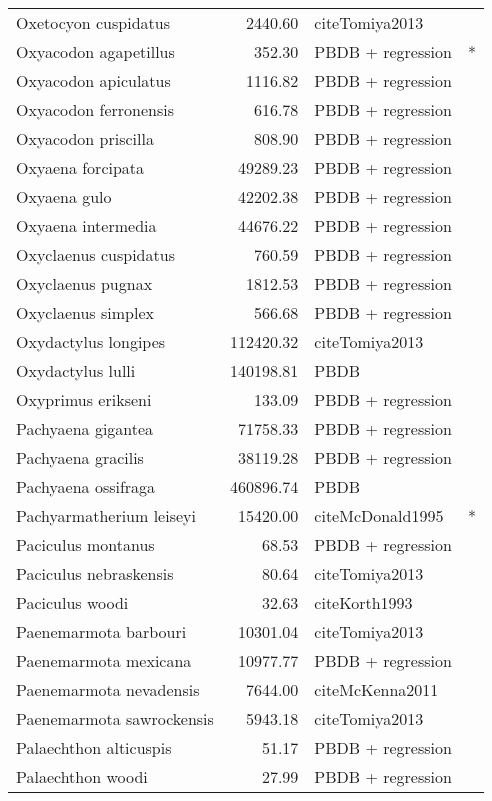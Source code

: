 \begin{table}[ht]
\begin{tabular}{lrll}
  Oxetocyon cuspidatus & 2440.60 & cite{Tomiya2013} &  \\ 
  Oxyacodon agapetillus & 352.30 & PBDB + regression & * \\ 
  Oxyacodon apiculatus & 1116.82 & PBDB + regression &  \\ 
  Oxyacodon ferronensis & 616.78 & PBDB + regression &  \\ 
  Oxyacodon priscilla & 808.90 & PBDB + regression &  \\ 
  Oxyaena forcipata & 49289.23 & PBDB + regression &  \\ 
  Oxyaena gulo & 42202.38 & PBDB + regression &  \\ 
  Oxyaena intermedia & 44676.22 & PBDB + regression &  \\ 
  Oxyclaenus cuspidatus & 760.59 & PBDB + regression &  \\ 
  Oxyclaenus pugnax & 1812.53 & PBDB + regression &  \\ 
  Oxyclaenus simplex & 566.68 & PBDB + regression &  \\ 
  Oxydactylus longipes & 112420.32 & cite{Tomiya2013} &  \\ 
  Oxydactylus lulli & 140198.81 & PBDB &  \\ 
  Oxyprimus erikseni & 133.09 & PBDB + regression &  \\ 
  Pachyaena gigantea & 71758.33 & PBDB + regression &  \\ 
  Pachyaena gracilis & 38119.28 & PBDB + regression &  \\ 
  Pachyaena ossifraga & 460896.74 & PBDB &  \\ 
  Pachyarmatherium leiseyi & 15420.00 & cite{McDonald1995} & * \\ 
  Paciculus montanus & 68.53 & PBDB + regression &  \\ 
  Paciculus nebraskensis & 80.64 & cite{Tomiya2013} &  \\ 
  Paciculus woodi & 32.63 & cite{Korth1993} &  \\ 
  Paenemarmota barbouri & 10301.04 & cite{Tomiya2013} &  \\ 
  Paenemarmota mexicana & 10977.77 & PBDB + regression &  \\ 
  Paenemarmota nevadensis & 7644.00 & cite{McKenna2011} &  \\ 
  Paenemarmota sawrockensis & 5943.18 & cite{Tomiya2013} &  \\ 
  Palaechthon alticuspis & 51.17 & PBDB + regression &  \\ 
  Palaechthon woodi & 27.99 & PBDB + regression &  \\ 

\end{tabular}
\end{table}
